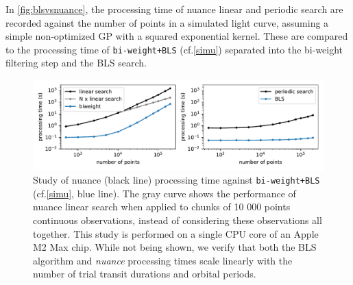 \documentclass[modern]{aastex631}
\newcommand{\nuancemethod}{\textit{nuance}}
\newcommand{\nuancecode}{\textsf{nuance}}
\begin{document}
\noindent In \autoref{fig:blsvsnuance}, the processing time of \nuancecode{} linear and periodic search are recorded against the number of points in a simulated light curve, assuming a simple non-optimized GP with a squared exponential kernel. These are compared to the processing time of \texttt{bi-weight+BLS} (cf.\;\autoref{simu}) separated into the bi-weight filtering step and the \textsf{BLS} search.
\begin{figure}[H]
    \begin{centering}
        \includegraphics[width=\linewidth]{../workflows/benchmark/figures/nuance_vs_bls.pdf}
        \caption{Study of \textsf{nuance} (black line) processing time against \texttt{bi-weight+BLS} (cf.\;\autoref{simu}, blue line). The gray curve shows the performance of \textsf{nuance} linear search when applied to chunks of 10 000 points continuous observations, instead of considering these observations all together. This study is performed on a single CPU core of an Apple M2 Max chip. While not being shown, we verify that both the \textsf{BLS} algorithm and \nuancemethod{} processing times scale linearly with the number of trial transit durations and orbital periods.}
        \label{fig:blsvsnuance}
    \end{centering}
\end{figure}
\end{document}
